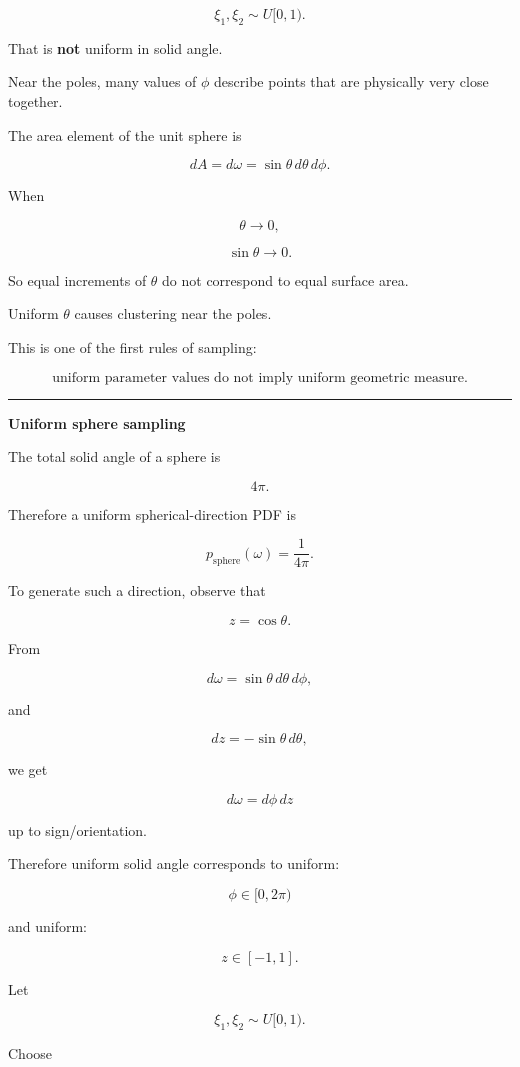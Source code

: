 \[
\xi_1,\xi_2\sim U[0,1).
\]

That is \textbf{not} uniform in solid angle.

Near the poles, many values of \(\phi\) describe points that are physically very close together.

The area element of the unit sphere is

\[
dA=d\omega
=
\sin\theta\,d\theta\,d\phi.
\]

When

\[
\theta\rightarrow0,
\]

\[
\sin\theta\rightarrow0.
\]

So equal increments of \(\theta\) do not correspond to equal surface area.

Uniform \(\theta\) causes clustering near the poles.

This is one of the first rules of sampling:

\[
\boxed{
\text{uniform parameter values do not imply uniform geometric measure.}
}
\]

\begin{center}\rule{0.5\linewidth}{0.5pt}\end{center}

\textbf{Uniform sphere sampling}

The total solid angle of a sphere is

\[
4\pi.
\]

Therefore a uniform spherical-direction PDF is

\[
\boxed{
p_{\text{sphere}}(\omega)
=
\frac{1}{4\pi}.
}
\]

To generate such a direction, observe that

\[
z=\cos\theta.
\]

From

\[
d\omega
=
\sin\theta\,d\theta\,d\phi,
\]

and

\[
dz=-\sin\theta\,d\theta,
\]

we get

\[
d\omega=d\phi\,dz
\]

up to sign/orientation.

Therefore uniform solid angle corresponds to uniform:

\[
\phi\in[0,2\pi)
\]

and uniform:

\[
z\in[-1,1].
\]

Let

\[
\xi_1,\xi_2\sim U[0,1).
\]

Choose

